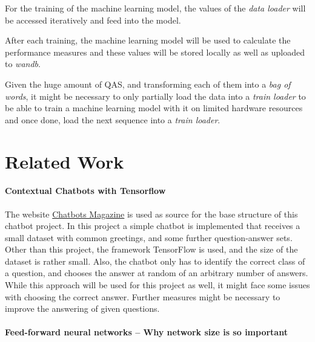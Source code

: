         For the training of the machine learning model, the values of the \emph{data loader} will be accessed iteratively and feed into the model.

        After each training, the machine learning model will be used to calculate the performance measures and these values will be stored locally as well as uploaded to \emph{wandb}.
        
        Given the huge amount of QAS, and transforming each of them into a \emph{bag of words}, it might be necessary to only partially load the data into a \emph{train loader} to be able to train a machine learning model with it on limited hardware resources and once done, load the next sequence into a \emph{train loader}.


\section{Related Work}
\label{sec:related-work}
    
        \paragraph{Contextual Chatbots with Tensorflow \cite{chatbottensorflow}}
        \label{par:-contextual-chatbot-tensorflow}

            The website \href{https://chatbotsmagazine.com/contextual-chat-bots-with-tensorflow-4391749d0077}{Chatbots Magazine} is used as source for the base structure of this chatbot project.
            In this project a simple chatbot is implemented that receives a small dataset with common greetings, and some further question-answer sets.
            Other than this project, the framework TensorFlow is used, and the size of the dataset is rather small.
            Also, the chatbot only has to identify the correct class of a question, and chooses the answer at random of an arbitrary number of answers.
            While this approach will be used for this project as well, it might face some issues with choosing the correct answer. Further measures might be necessary to improve the answering of given questions.
            
            
        \paragraph{Feed-forward neural networks -- Why network size is so important}
        \label{par:feed-forward-neural-networks}
            
